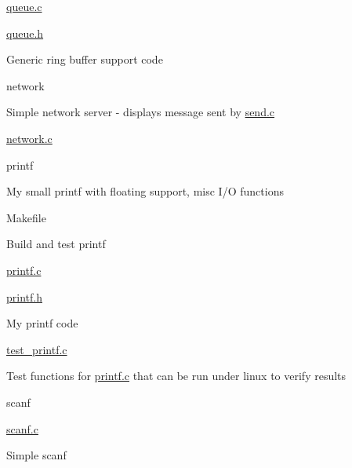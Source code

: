 \hyperlink{queue_8c}{queue.\+c}
\begin{DoxyItemize}
\item \hyperlink{queue_8h}{queue.\+h}
\begin{DoxyItemize}
\item Generic ring buffer support code
\end{DoxyItemize}
\end{DoxyItemize}

network
\begin{DoxyItemize}
\item Simple network server -\/ displays message sent by \hyperlink{send_8c}{send.\+c}
\begin{DoxyItemize}
\item \hyperlink{network_8c}{network.\+c}
\end{DoxyItemize}
\end{DoxyItemize}

printf
\begin{DoxyItemize}
\item My small printf with floating support, misc I/O functions
\begin{DoxyItemize}
\item Makefile
\begin{DoxyItemize}
\item Build and test printf
\end{DoxyItemize}
\item \hyperlink{printf_8c}{printf.\+c}
\item \hyperlink{printf_8h}{printf.\+h}
\begin{DoxyItemize}
\item My printf code
\end{DoxyItemize}
\item \hyperlink{test__printf_8c}{test\+\_\+printf.\+c}
\begin{DoxyItemize}
\item Test functions for \hyperlink{printf_8c}{printf.\+c} that can be run under linux to verify results
\end{DoxyItemize}
\end{DoxyItemize}
\end{DoxyItemize}

scanf
\begin{DoxyItemize}
\item \hyperlink{scanf_8c}{scanf.\+c}
\begin{DoxyItemize}
\item Simple scanf
\end{DoxyItemize}
\end{DoxyItemize}

